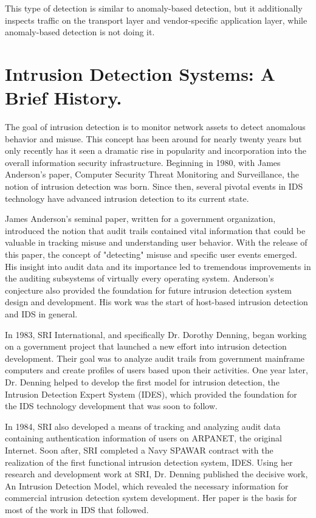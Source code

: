 \documentclass[thesis=M,english]{FITthesis}[2011/07/15]
\begin{document}
This type of detection is similar to anomaly-based detection, but it additionally inspects traffic on the transport layer and vendor-specific application layer, while anomaly-based detection is not doing it.

\section{Intrusion Detection Systems: A Brief History.}
The goal of intrusion detection is to monitor network assets to detect anomalous behavior and misuse. This concept has been around for nearly twenty years but only recently has it seen a dramatic rise in popularity and incorporation into the overall information security infrastructure. Beginning in 1980, with James Anderson's paper, Computer Security Threat Monitoring and Surveillance, the notion of intrusion detection was born. Since then, several pivotal events in IDS technology have advanced intrusion detection to its current state.

James Anderson's seminal paper, written for a government organization, introduced the notion that audit trails contained vital information that could be valuable in tracking misuse and understanding user behavior. With the release of this paper, the concept of "detecting" misuse and specific user events emerged. His insight into audit data and its importance led to tremendous improvements in the auditing subsystems of virtually every operating system. Anderson's conjecture also provided the foundation for future intrusion detection system design and development. His work was the start of host-based intrusion detection and IDS in general.

In 1983, SRI International, and specifically Dr. Dorothy Denning, began working on a government project that launched a new effort into intrusion detection development. Their goal was to analyze audit trails from government mainframe computers and create profiles of users based upon their activities. One year later, Dr. Denning helped to develop the first model for intrusion detection, the Intrusion Detection Expert System (IDES), which provided the foundation for the IDS technology development that was soon to follow.

In 1984, SRI also developed a means of tracking and analyzing audit data containing authentication information of users on ARPANET, the original Internet. Soon after, SRI completed a Navy SPAWAR contract with the realization of the first functional intrusion detection system, IDES. Using her research and development work at SRI, Dr. Denning published the decisive work, An Intrusion Detection Model, which revealed the necessary information for commercial intrusion detection system development. Her paper is the basis for most of the work in IDS that followed.
\end{document}
